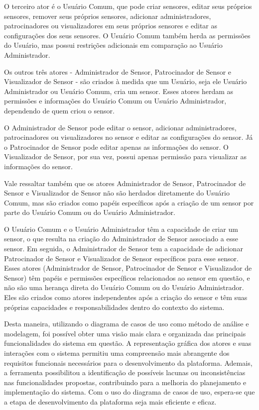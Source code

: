 \documentclass[tcc,capa]{texufpel}
\begin{document}
O terceiro ator é o Usuário Comum, que pode criar sensores, editar seus próprios sensores, remover seus próprios sensores, adicionar administradores, patrocinadores ou visualizadores em seus próprios sensores e editar as configurações dos seus sensores. O Usuário Comum também herda as permissões do Usuário, mas possui restrições adicionais em comparação ao Usuário Administrador.

Os outros três atores - Administrador de Sensor, Patrocinador de Sensor e Visualizador de Sensor - são criados à medida que um Usuário, seja ele Usuário Administrador ou Usuário Comum, cria um sensor. Esses atores herdam as permissões e informações do Usuário Comum ou Usuário Administrador, dependendo de quem criou o sensor.

O Administrador de Sensor pode editar o sensor, adicionar administradores, patrocinadores ou visualizadores no sensor e editar as configurações do sensor. Já o Patrocinador de Sensor pode editar apenas as informações do sensor. O Visualizador de Sensor, por sua vez, possui apenas permissão para visualizar as informações do sensor.

Vale ressaltar também que os atores Administrador de Sensor, Patrocinador de Sensor e Visualizador de Sensor não são herdados diretamente do Usuário Comum, mas são criados como papéis específicos após a criação de um sensor por parte do Usuário Comum ou do Usuário Administrador.

O Usuário Comum e o Usuário Administrador têm a capacidade de criar um sensor, o que resulta na criação do Administrador de Sensor associado a esse sensor. Em seguida, o Administrador de Sensor tem a capacidade de adicionar Patrocinador de Sensor e Visualizador de Sensor específicos para esse sensor. Esses atores (Administrador de Sensor, Patrocinador de Sensor e Visualizador de Sensor) têm papéis e permissões específicos relacionados ao sensor em questão, e não são uma herança direta do Usuário Comum ou do Usuário Administrador. Eles são criados como atores independentes após a criação do sensor e têm suas próprias capacidades e responsabilidades dentro do contexto do sistema.

Desta maneira, utilizando o diagrama de casos de uso como método de análise e modelagem, foi possível obter uma visão mais clara e organizada das principais funcionalidades do sistema em questão. A representação gráfica dos atores e suas interações com o sistema permitiu uma compreensão mais abrangente dos requisitos funcionais necessários para o desenvolvimento da plataforma. Ademais, a ferramenta possibilitou a identificação de possíveis lacunas ou inconsistências nas funcionalidades propostas, contribuindo para a melhoria do planejamento e implementação do sistema. Com o uso do diagrama de casos de uso, espera-se que a etapa de desenvolvimento da plataforma seja mais eficiente e eficaz.
\end{document}
